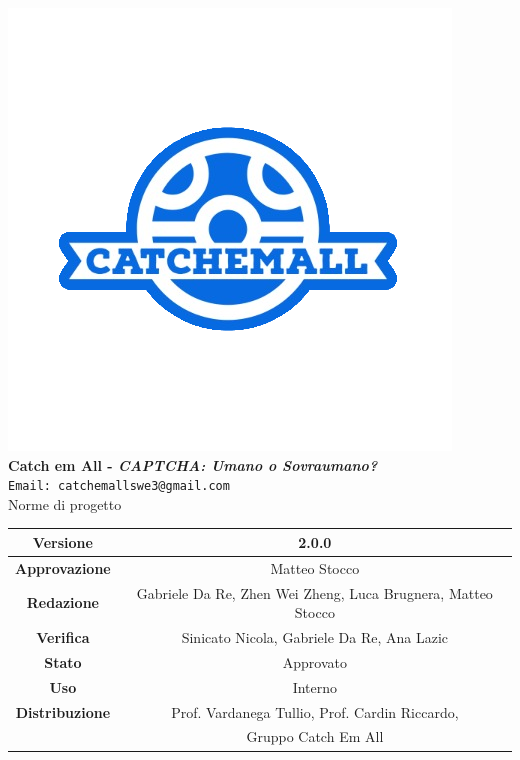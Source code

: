 \begin{titlepage}
\begin{center}
	\includegraphics[scale = 1.5]{img/logo.png}\\
	\bigskip
	\large \textbf{Catch em All - \textit{CAPTCHA: Umano o Sovraumano?}}\\
	\texttt{Email: catchemallswe3@gmail.com}\\
	\vfill
	{\fontsize{1.5cm}{0}\selectfont Norme di progetto}\\
	\vfill
	\setlength\extrarowheight{5pt}
	\begin{tabularx}{\textwidth}{| c | c |}
		\hline
		\textbf{Versione} & 2.0.0\\
		\hline
		\textbf{Approvazione} & Matteo Stocco\\
		\hline
		\textbf{Redazione} & Gabriele Da Re, Zhen Wei Zheng, Luca Brugnera, Matteo Stocco\\
		\hline
		\textbf{Verifica} & Sinicato Nicola, Gabriele Da Re, Ana Lazic\\
		\hline
		\textbf{Stato} & Approvato\\
		\hline
		\textbf{Uso} & Interno\\
		\hline
		\textbf{Distribuzione} & Prof. Vardanega Tullio, Prof. Cardin Riccardo,\\
		 & Gruppo Catch Em All\\
		\hline
	\end{tabularx}
\end{center}
\end{titlepage}
